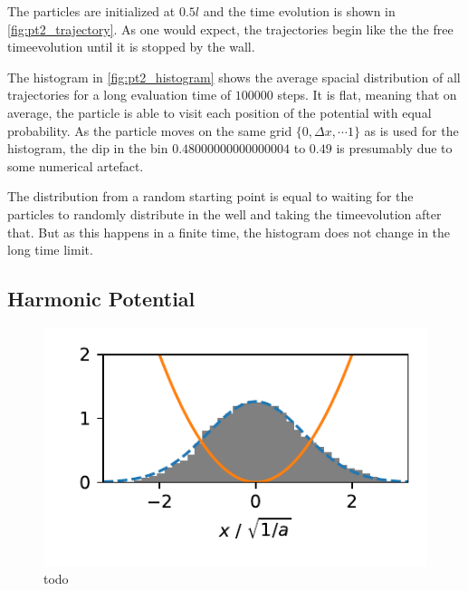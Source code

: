 \documentclass[
    parskip=half, 
    twoside=false,
    twocolumn=true,
    fontsize=11pt,
]{scrarticle}
\begin{document}
The particles are initialized at $0.5 l$ and the time evolution is shown in \autoref{fig:pt2_trajectory}.
As one would expect, the trajectories begin like the the free timeevolution until it is stopped by the wall.

The histogram in \autoref{fig:pt2_histogram} shows the average spacial distribution of all trajectories for a long evaluation time of $100000$ steps. 
It is flat, meaning that on average, the particle is able to visit each position of the potential with equal probability.
As the particle moves on the same grid $\{0, \Delta x, \cdots 1\}$ as is used for the histogram, the dip in the bin $0.48000000000000004$ to $0.49$ is presumably due to some numerical artefact.

The distribution from a random starting point is equal to waiting for the particles to randomly distribute in the well and taking the timeevolution after that.
But as this happens in a finite time, the histogram does not change in the long time limit.


\subsection{Harmonic Potential}
\begin{figure}
    \centering
    \includegraphics{figures/03 histogram.pdf}
    \caption{todo}
\end{figure}
\end{document}
